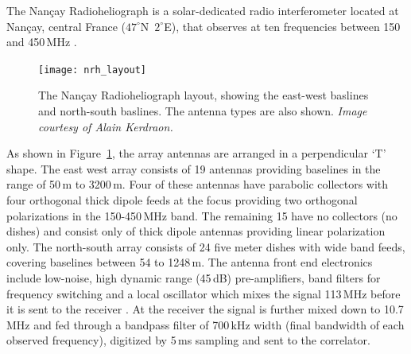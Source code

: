 The Nan\c{c}ay Radioheliograph is a solar-dedicated radio interferometer located at Nan\c{c}ay, central France ($47^{\circ}$N~$2^{\circ}$E), that observes at ten frequencies between 150 and 450\,MHz \citep{kerdraon1997}.
\begin{figure}
\centering
\texttt{[image: nrh\_layout]}
\caption[The Nan\c{c}ay Radioheliograph layout]{The Nan\c{c}ay Radioheliograph layout, showing the east-west baslines and north-south baslines. The antenna types are also shown. {\it Image courtesy of Alain Kerdraon.}}
\label{fig:nrh_layout}
\end{figure}
As shown in Figure~\ref{fig:nrh_layout}, the array antennas are arranged in a perpendicular \textquoteleft T' shape. The east west array consists of 19 antennas providing baselines in the range of 50\,m to 3200\,m. Four of these antennas have parabolic collectors with four orthogonal thick dipole feeds at the focus providing two orthogonal polarizations in the 150-450\,MHz band. The remaining 15 have no collectors (no dishes) and consist only of thick dipole antennas providing linear polarization only. The north-south array consists of 24 five meter dishes with wide band feeds, covering baselines between 54 to 1248\,m. The antenna front end electronics include low-noise, high dynamic range (45\,dB) pre-amplifiers, band filters for frequency switching and a local oscillator which mixes the signal 113\,MHz before it is sent to the receiver \citep{avignon1989}. At the receiver the signal is further mixed down to 10.7\,MHz and fed through a bandpass filter of 700\,kHz width (final bandwidth of each observed frequency), digitized  by 5\,ms sampling and sent to the correlator.


